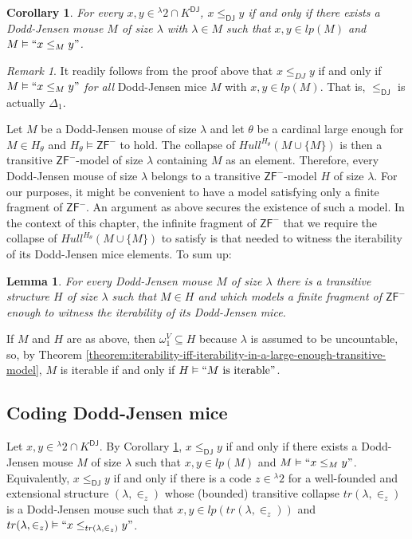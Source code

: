 \documentclass{amsart}
\numberwithin{equation}{section}
\newtheorem{lemma}[theorem]{Lemma}
\newtheorem{corollary}[theorem]{Corollary}
\theoremstyle{definition}
\theoremstyle{remark}
\newtheorem{remark}[theorem]{Remark}
\begin{document}
\begin{corollary}\label{corollary:x-less-than-y-iff-less-in-dj-mouse} For every $x,y\in{}^{\lambda}2\cap K^{\mathsf{DJ}}$, $x\leq_{\mathsf{DJ}}y$ if and only if there exists a Dodd-Jensen mouse $M$ of size $\lambda$ with $\lambda\in M$ such that $x,y\in lp(M)$ and $M\vDash ``x\leq_{M}y"$. 
\end{corollary}

\begin{remark}
	It readily follows from the proof above that $x\leq_{DJ}y$ if and only if $M\vDash ``x\leq_{M}y"$ \emph{for all} Dodd-Jensen mice $M$ with $x,y\in lp(M)$. That is, $\leq_{\mathsf{DJ}}$ is actually $\Delta_1$.  
\end{remark}

Let $M$ be a Dodd-Jensen mouse of size $\lambda$ and let $\theta$ be a cardinal large enough for $M\in H_{\theta}$ and $H_{\theta}\vDash \mathsf{ZF^{-}}$ to hold. The collapse of $Hull^{H_{\theta}}(M\cup\{M\})$ is then a transitive $\mathsf{ZF^{-}}$-model of size $\lambda$ containing $M$ as an element. Therefore, every Dodd-Jensen mouse of size $\lambda$ belongs to a transitive $\mathsf{ZF^{-}}$-model $H$ of size $\lambda$. For our purposes, it might be convenient to have a model satisfying only a finite fragment of $\mathsf{ZF^{-}}$. An argument as above secures the existence of such a model. In the context of this chapter, the infinite fragment of $\mathsf{ZF^{-}}$ that we require the collapse of $Hull^{H_{\theta}}(M\cup\{M\})$ to satisfy is that needed to witness the iterability of its Dodd-Jensen mice elements. To sum up:

\begin{lemma}\label{l34b} For every Dodd-Jensen mouse $M$ of size $\lambda$ there is a transitive 
	structure $H$ of size $\lambda$ such that $M\in H$ and which models a finite fragment of $\mathsf{ZF^{-}}$ enough to witness the iterability of its Dodd-Jensen mice.
\end{lemma}

If $M$ and $H$ are as above, then $\omega_1^{V}\subseteq H$ because $\lambda$ is assumed to be uncountable, so, by Theorem \ref{theorem:iterability-iff-iterability-in-a-large-enough-transitive-model}, $M$ is iterable if and only if $H\vDash``M\text{ is iterable}"$.

\subsection{Coding Dodd-Jensen mice} Let $x,y\in{}^{\lambda}2\cap K^{\mathsf{DJ}}$. By Corollary \ref{corollary:x-less-than-y-iff-less-in-dj-mouse}, $x\leq_{\mathsf{DJ}}y$ if and only if there exists a Dodd-Jensen mouse $M$ of size $\lambda$ such that $x,y\in lp(M)$ and $M\vDash ``x\leq_{M}y"$. Equivalently, $x\leq_{\mathsf{DJ}}y$ if and only if there is a code $z\in{}^{\lambda}2$ for a well-founded and extensional structure $(\lambda,\in_{z})$ whose (bounded) transitive collapse $tr(\lambda,\in_{z})$ is a Dodd-Jensen mouse such that $x,y\in lp(tr(\lambda,\in_{z}))$ and $tr(\lambda,\in_{z})\vDash``x\leq_{tr(\lambda,\in_{z})}y"$. 
\end{document}
